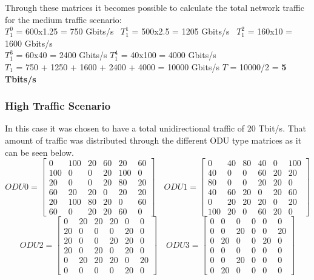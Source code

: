\vspace{17pt}
Through these matrices it becomes possible to calculate the total network traffic for the medium traffic scenario:\\

$T_1^0$ = 600x1.25 = 750 Gbits/s \  $T_1^1$ = 500x2.5 = 1205 Gbits/s \  $T_1^2$ = 160x10 = 1600 Gbits/s \\

$T_1^3$ = 60x40 = 2400 Gbits/s \quad
$T_1^4$ = 40x100 = 4000 Gbits/s \\

$T_{1}$ = 750 + 1250 + 1600 + 2400 + 4000 = 10000 Gbits/s \qquad
$T$ = 10000/2 = \textbf{5 Tbits/s}\\



\subsubsection{High Traffic Scenario}
\label{high}
In this case it was chosen to have a total unidirectional traffic of 20 Tbit/s. That amount of traffic was distributed through the different ODU type matrices as it can be seen below. 
\[
ODU0=
  \begin{bmatrix}
    0 & 100 & 20 & 60 & 20 & 60 \\
    100 & 0 & 0 & 20 & 100 & 0 \\
    20 & 0 & 0 & 20 & 80 & 20 \\
    60 & 20 & 20 & 0 & 20 & 20 \\
    20 & 100 & 80 & 20 & 0 & 60 \\
    60 & 0 & 20 & 20 & 60 & 0
  \end{bmatrix}
\quad ODU1=
  \begin{bmatrix}
    0 & 40 & 80 & 40 & 0 & 100 \\
    40 & 0 & 0 & 60 & 20 & 20 \\
    80 & 0 & 0 & 20 & 20 & 0 \\
    40 & 60 & 20 & 0 & 20 & 60 \\
    0 & 20 & 20 & 20 & 0 & 20 \\
    100 & 20 & 0 & 60 & 20 & 0
  \end{bmatrix}
\]
\[
ODU2=
  \begin{bmatrix}
    0 & 20 & 20 & 20 & 0 & 0 \\
    20 & 0 & 0 & 0 & 20 & 0 \\
    20 & 0 & 0 & 20 & 20 & 0 \\
    20 & 0 & 20 & 0 & 20 & 0 \\
    0 & 20 & 20 & 20 & 0 & 20 \\
    0 & 0 & 0 & 0 & 20 & 0
  \end{bmatrix}
\quad ODU3=
  \begin{bmatrix}
    0 & 0 & 0 & 0 & 0 & 0 \\
    0 & 0 & 20 & 0 & 0 & 20 \\
    0 & 20 & 0 & 0 & 20 & 0 \\
    0 & 0 & 0 & 0 & 0 & 0 \\
    0 & 0 & 20 & 0 & 0 & 0 \\
    0 & 20 & 0 & 0 & 0 & 0
  \end{bmatrix}
\]

